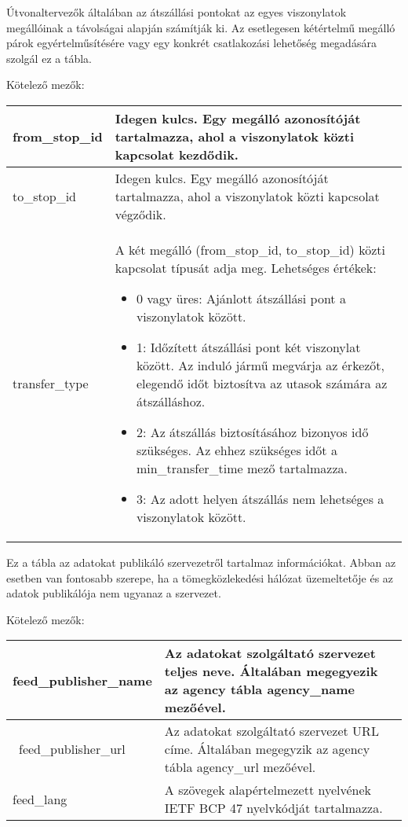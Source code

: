 
Útvonaltervezők általában az átszállási pontokat az egyes viszonylatok megállóinak a távolságai alapján számítják ki. Az esetlegesen kétértelmű megálló párok egyértelműsítésére vagy egy konkrét csatlakozási lehetőség megadására szolgál ez a tábla.

\medskip

\noindent Kötelező mezők:

\bigskip

\begin{tabular}{|p{3cm}|p{10cm}|}
\hline
from\_stop\_id & Idegen kulcs. Egy megálló azonosítóját tartalmazza, ahol a viszonylatok közti kapcsolat kezdődik.  \\
\hline
to\_stop\_id & Idegen kulcs. Egy megálló azonosítóját tartalmazza, ahol a viszonylatok közti kapcsolat végződik. \\
\hline
transfer\_type & A két megálló (from\_stop\_id, to\_stop\_id) közti kapcsolat típusát adja meg.
Lehetséges értékek:
\begin{itemize}
\item 0 vagy üres: Ajánlott átszállási pont a viszonylatok között.
\item 1: Időzített átszállási pont két viszonylat között. Az induló jármű megvárja az érkezőt, elegendő időt biztosítva az utasok számára az átszálláshoz.
\item 2: Az átszállás biztosításához bizonyos idő szükséges. Az ehhez szükséges időt a min\_transfer\_time mező tartalmazza.
\item 3: Az adott helyen átszállás nem lehetséges a viszonylatok között.
\end{itemize}
\\
\hline
\end{tabular}


Ez a tábla az adatokat publikáló szervezetről tartalmaz információkat. Abban az esetben van fontosabb szerepe, ha a tömegközlekedési hálózat üzemeltetője és az adatok publikálója nem ugyanaz a szervezet.

\medskip

\noindent Kötelező mezők:

\bigskip

\begin{tabular}{|p{4cm}|p{9cm}|}
\hline
feed\_publisher\_name & Az adatokat szolgáltató szervezet teljes neve. Általában megegyezik az agency tábla agency\_name mezőével. \\
\hline\
feed\_publisher\_url & Az adatokat szolgáltató szervezet URL címe. Általában megegyzik az agency tábla agency\_url mezőével. \\
\hline
feed\_lang & A szövegek alapértelmezett nyelvének IETF BCP 47 nyelvkódját tartalmazza. \\
\hline
\end{tabular}

